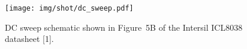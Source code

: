 \begin{figure}[H]
	\centering
	\texttt{[image: img/shot/dc\_sweep.pdf]}
	\caption{DC sweep schematic shown in Figure~5B of the Intersil ICL8038 datasheet [1].}
\end{figure}
